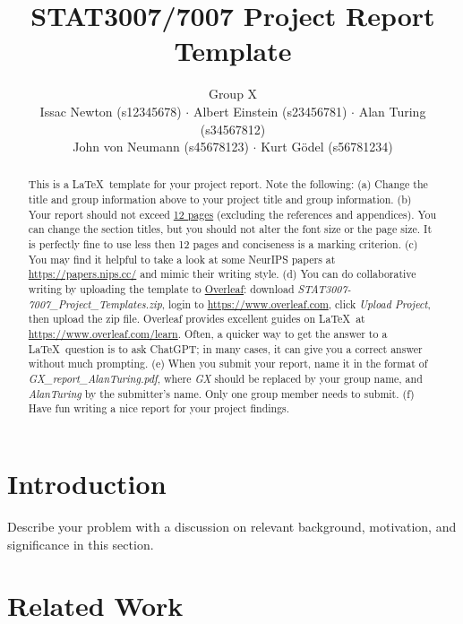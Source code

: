 \documentclass[a4paper,11pt]{article} %
\begin{document}
\title{STAT3007/7007 Project Report Template}
\author{Group X \\
Issac Newton (s12345678) $\cdot$
Albert Einstein (s23456781) $\cdot$
Alan Turing (s34567812) \\
John von Neumann (s45678123) $\cdot$ Kurt G\"odel (s56781234)}

\date{}
\maketitle

\begin{abstract}
	This is a \LaTeX\ template for your project report.
	Note the following: 
	(a) Change the title and group information above to your project title and
	group information.
	(b) Your report should not exceed \underline{12 pages} (excluding the references and
	appendices).
	You can change the section titles, but you should not alter the font size or
	the page size.
	It is perfectly fine to use less then 12 pages and conciseness is a marking
	criterion.
	(c) You may find it helpful to take a look at some NeurIPS papers at
	\url{https://papers.nips.cc/} and mimic their writing style.
	(d) You can do collaborative writing by uploading the template to \underline{Overleaf}:
	download \emph{STAT3007-7007\_Project\_Templates.zip},
	login to \url{https://www.overleaf.com},
	click \emph{Upload Project},
	then upload the zip file.
	Overleaf provides excellent guides on \LaTeX\ at
	\url{https://www.overleaf.com/learn}.
	Often, a quicker way to get the answer to a \LaTeX\ question is to ask ChatGPT;
	in many cases, it can give you a correct answer without much prompting.
	(e) When you submit your report, name it in the format of
	\emph{GX\_report\_AlanTuring.pdf}, where 
	\emph{GX} should be replaced by your group name, and \emph{AlanTuring} by the
	submitter's name.
	Only one group member needs to submit.
	(f) Have fun writing a nice report for your project findings.
\end{abstract}

\section{Introduction}

Describe your problem with a discussion on relevant background, motivation, and
significance in this section.

\section{Related Work}
\end{document}
